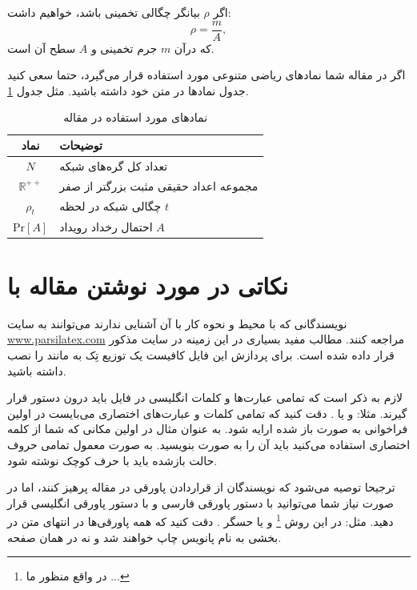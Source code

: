 \documentclass{CCI2020}
\begin{document}
اگر 
$\rho$
 بیانگر چگالی تخمینی باشد، خواهیم داشت:
\begin{equation}
\rho = \frac{m}{A},
\end{equation}
که درآن  $m$ جرم تخمینی و $A$ سطح آن است. 

اگر در مقاله شما نمادهای ریاضی متنوعی مورد استفاده قرار می‌گیرد، حتما سعی کنید جدول نمادها در متن خود داشته باشید. مثل جدول 
\ref{tab:symbols}.

\begin{table}[t]
\centering
\caption{نمادهای مورد استفاده در  مقاله}
\label{tab:symbols}
\begin{tabular}{cp{6cm}}\hline
نماد & توضیحات
\\\hline
$N$ &
تعداد کل گره‌های شبکه
\\
$\mathbb{R}^{++}$ &
مجموعه اعداد حقیقی مثبت بزرگتر از صفر
\\
$\rho_{t}$ &
چگالی شبکه در لحظه $t$
\\
$\mathrm{Pr}[A]$ &
احتمال رخداد رویداد $A$
\\
\hline
\end{tabular}
\end{table}



\section{نکاتی در مورد نوشتن مقاله با \lr{\LaTeX}}
نویسندگانی که با محیط
\lr{\LaTeX}
 و نحوه کار با آن آشنایی ندارند می‌توانند به سایت
\url{www.parsilatex.com}
مراجعه کنند. مطالب مفید بسیاری در این زمینه در سایت مذکور قرار داده شده است. 
برای پردازش این فایل کافیست یک توزیع تِک به مانند
 را نصب داشته باشید.
 
لازم به ذکر است که تمامی عبارت‌ها و کلمات انگلیسی در فایل
 \lr{\LaTeX}
  باید درون دستور
  قرار گیرند. مثلا:
 و یا
.
دقت کنید که تمامی کلمات و عبارت‌های اختصاری می‌بایست در اولین فراخوانی به صورت باز شده ارایه شود. به عنوان مثال در اولین مکانی که شما از کلمه اختصاری 
 استفاده می‌کنید باید آن را به صورت 
بنویسید. به صورت معمول تمامی حروف حالت بازشده باید با حرف کوچک نوشته شود.

ترجیحا توصیه می‌شود که نویسندگان از قراردادن پاورقی در مقاله پرهیز کنند، اما در صورت نیاز شما می‌توانید با دستور 
 پاورقی فارسی و با دستور
 پاورقی انگلیسی قرار دهید. مثل: در این روش
\footnote{در واقع منظور ما ...}
 و یا حسگر
.
 دقت کنید که همه پاورقی‌ها در انتهای متن در بخشی به نام پانویس چاپ خواهند شد و نه در همان صفحه.
\end{document}
